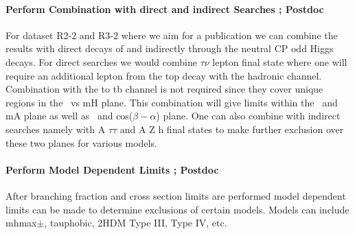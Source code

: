 \paragraph{Perform Combination with direct and indirect Searches ;  Postdoc}%
For dataset R2-2 and R3-2 where we aim for a publication we can combine the results with direct decays of \Hp and indirectly through the neutral CP odd Higgs decays.  For direct searches we would combine \Hp \too $\tau \nu $ lepton final state where one will
require an additional lepton from the top decay with the hadronic channel.  Combination with the \Hp to tb channel is not required since they cover unique regions in the \tanb\ vs mH plane. This combination will give limits within the \tanb\ and mA plane as well as \tanb\ and cos($\beta-\alpha$) plane. 
One can also combine with indirect searches namely with A \too $\tau \tau$ and A \too Z h final states to make further exclusion over these two planes for various models.

\paragraph{Perform Model Dependent Limits ;  Postdoc} %
After branching fraction and cross section limits are performed model dependent limits can be made to determine exclusions of certain models.  Models can include mhmax$\pm$, tauphobic, 2HDM Type III, Type IV, etc.  
